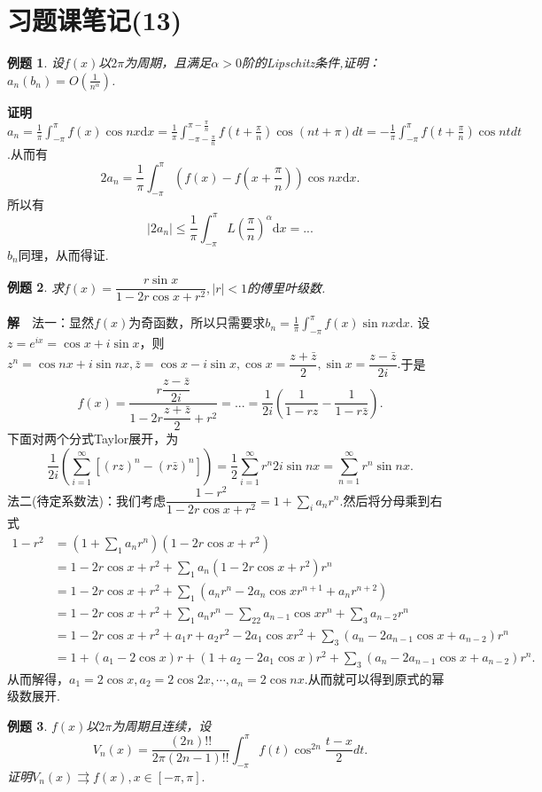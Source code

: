 \documentclass[UTF8]{article}
\newcommand{\dx}{\mathrm{d}x}
\newcommand{\zm}{\textbf{证明}$\quad$}
\newcommand{\jie}{\textbf{解}$\quad$}
\newtheorem{exa}{\hspace{2em}例题}[section]
\begin{document}
  \section{习题课笔记(13)}
  \begin{exa}
    设$f(x)$以$2\pi$为周期，且满足$\alpha>0$阶的Lipschitz条件,证明：$a_n(b_n)=O(\frac{1}{n^\alpha})$.
  \end{exa}
  \zm $a_n=\frac{1}{\pi}\int_{-\pi}^\pi f(x)\cos nx\dx=\frac{1}{\pi}\int_{-\pi-\frac{\pi}{n}}^{\pi-\frac{\pi}{n}}
  f(t+\frac{\pi}{n})\cos(nt+\pi)dt=-\frac{1}{\pi}\int_{-\pi}^\pi f(t+\frac{\pi}{n})\cos ntdt$.从而有
  $$2a_n=\frac{1}{\pi}\int_{-\pi}^\pi (f(x)-f(x+\frac{\pi}{n}))\cos nx\dx.$$
  所以有
  $$|2a_n|\le\frac{1}{\pi}\int_{-\pi}^\pi L(\frac{\pi}{n})^\alpha \dx=...$$
  $b_n$同理，从而得证.
  \begin{exa}
    求$f(x)=\dfrac{r\sin x}{1-2r\cos x+r^2},|r|<1$的傅里叶级数.
  \end{exa}
  \jie 法一：显然$f(x)$为奇函数，所以只需要求$b_n=\frac{1}{\pi}\int_{-\pi}^\pi f(x)\sin nx\dx$.
  设$z=e^{ix}=\cos x+i\sin x$，则$z^n=\cos nx+i\sin nx,\bar{z}=\cos x-i\sin x,\cos x=\dfrac{z+\bar{z}}{2},
  \sin x=\dfrac{z-\bar{z}}{2i}.$于是
  $$f(x)=\frac{r\dfrac{z-\bar{z}}{2i}}{1-2r\dfrac{z+\bar{z}}{2}+r^2}=...=\frac{1}{2i}(\frac{1}{1-rz}-
  \frac{1}{1-r\bar{z}}).$$
  下面对两个分式Taylor展开，为
  $$\frac{1}{2i}(\sum_{i=1}^\infty[(rz)^n-(r\bar{z})^n])=\frac{1}{2}\sum_{i=1}^\infty r^n2i\sin nx=
  \sum_{n=1}^\infty r^n\sin nx.$$
  法二(待定系数法)：我们考虑$\dfrac{1-r^2}{1-2r\cos x+r^2}=1+\sum_i a_n r^n.$然后将分母乘到右式
  \begin{align*}
    1-r^2&=(1+\sum_1 a_nr^n)(1-2r\cos x+r^2)\\
    &=1-2r\cos x+r^2+\sum_1a_n(1-2r\cos x+r^2)r^n\\
    &=1-2r\cos x+r^2+\sum_1(a_nr^n-2a_n\cos xr^{n+1}+a_nr^{n+2})\\
    &=1-2r\cos x+r^2+\sum_1a_nr^n-\sum_22a_{n-1}\cos xr^n+\sum_3a_{n-2}r^n\\
    &=1-2r\cos x+r^2+a_1r+a_2r^2-2a_1\cos xr^2+\sum_3(a_n-2a_{n-1}\cos x+a_{n-2})r^n\\
    &=1+(a_1-2\cos x)r+(1+a_2-2a_1\cos x)r^2+\sum_3(a_n-2a_{n-1}\cos x+a_{n-2})r^n.
  \end{align*}
  从而解得，$a_1=2\cos x,a_2=2\cos 2x,\cdots,a_n=2\cos nx.$从而就可以得到原式的幂级数展开.
  \begin{exa}
    $f(x)$以$2\pi$为周期且连续，设
    $$V_n(x)=\frac{(2n)!!}{2\pi(2n-1)!!}\int_{-\pi}^\pi f(t)\cos^{2n}\frac{t-x}{2}dt.$$
    证明$V_n(x)\rightrightarrows f(x),x\in[-\pi,\pi].$
  \end{exa}
\end{document}
